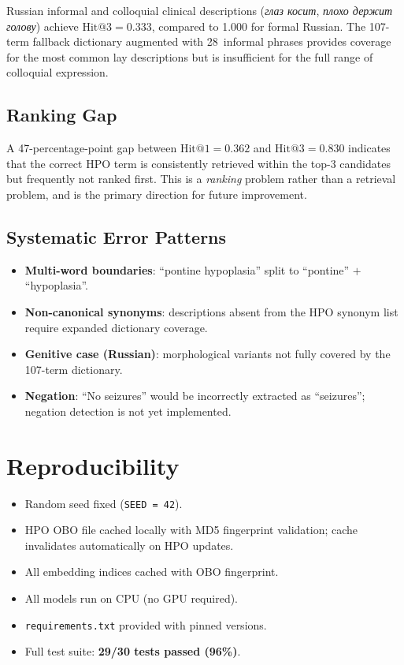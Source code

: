 \documentclass[11pt,a4paper]{article}
\begin{document}
Russian informal and colloquial clinical descriptions (\textit{глаз косит},
\textit{плохо держит голову}) achieve $\text{Hit@3} = 0.333$, compared to
1.000 for formal Russian.  The 107-term fallback dictionary augmented with
28~informal phrases provides coverage for the most common lay descriptions but
is insufficient for the full range of colloquial expression.

\subsection{Ranking Gap}

A 47-percentage-point gap between $\text{Hit@1} = 0.362$ and
$\text{Hit@3} = 0.830$ indicates that the correct HPO term is consistently
retrieved within the top-3 candidates but frequently not ranked first.  This
is a \emph{ranking} problem rather than a retrieval problem, and is the primary
direction for future improvement.

\subsection{Systematic Error Patterns}

\begin{itemize}[nosep]
  \item \textbf{Multi-word boundaries}: ``pontine hypoplasia'' split to
        ``pontine'' $+$ ``hypoplasia''.
  \item \textbf{Non-canonical synonyms}: descriptions absent from the HPO
        synonym list require expanded dictionary coverage.
  \item \textbf{Genitive case (Russian)}: morphological variants not fully
        covered by the 107-term dictionary.
  \item \textbf{Negation}: ``No seizures'' would be incorrectly extracted as
        ``seizures''; negation detection is not yet implemented.
\end{itemize}

\section{Reproducibility}

\begin{itemize}[nosep]
  \item Random seed fixed (\texttt{SEED = 42}).
  \item HPO OBO file cached locally with MD5 fingerprint validation;
        cache invalidates automatically on HPO updates.
  \item All embedding indices cached with OBO fingerprint.
  \item All models run on CPU (no GPU required).
  \item \texttt{requirements.txt} provided with pinned versions.
  \item Full test suite: \textbf{29/30 tests passed (96\%)}.
\end{itemize}
\end{document}
